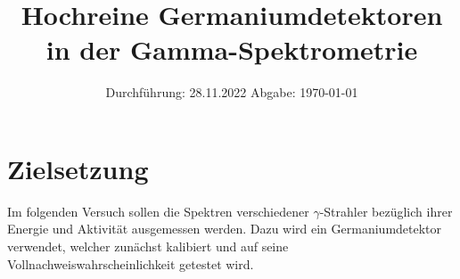 

\subject{V18}
\title{Hochreine Germaniumdetektoren in der Gamma-Spektrometrie}
\date{
    Durchführung: 28.11.2022
     \hspace{3em}
    Abgabe: \today %
}


\maketitle
\thispagestyle{empty}
\tableofcontents
\newpage

\section{Zielsetzung}

    Im folgenden Versuch sollen die Spektren verschiedener $\gamma$-Strahler bezüglich ihrer Energie und Aktivität ausgemessen werden.
    Dazu wird ein Germaniumdetektor verwendet,
    welcher zunächst kalibiert und auf seine Vollnachweiswahrscheinlichkeit getestet wird.


\clearpage


\clearpage


\clearpage


\clearpage

\printbibliography



